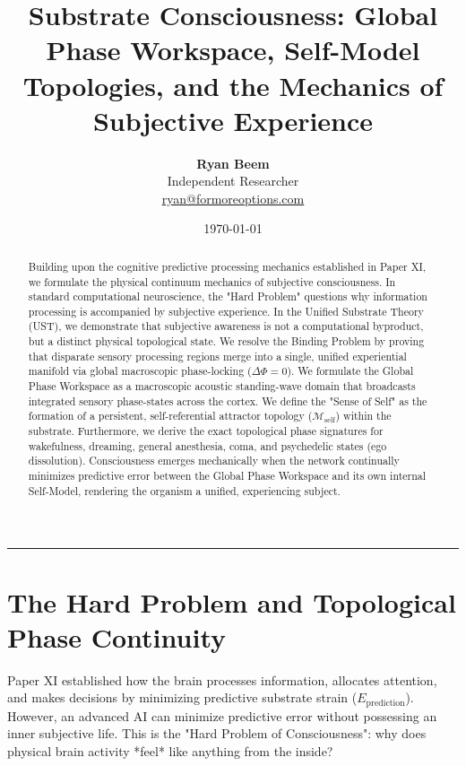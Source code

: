 \documentclass[11pt,a4paper]{article}
\title{\Large\bfseries Substrate Consciousness: Global Phase Workspace, Self-Model Topologies, and the Mechanics of Subjective Experience}
\author{
	\textbf{Ryan Beem}\\[0.5em]
	\small Independent Researcher \\
	\small \href{mailto:ryan@formoreoptions.com}{ryan@formoreoptions.com}
}
\date{\today}
\begin{document}
	
	\maketitle
	
	\begin{abstract}
		Building upon the cognitive predictive processing mechanics established in Paper XI, we formulate the physical continuum mechanics of subjective consciousness. In standard computational neuroscience, the "Hard Problem" questions why information processing is accompanied by subjective experience. In the Unified Substrate Theory (UST), we demonstrate that subjective awareness is not a computational byproduct, but a distinct physical topological state. We resolve the Binding Problem by proving that disparate sensory processing regions merge into a single, unified experiential manifold via global macroscopic phase-locking ($\Delta \Phi = 0$). We formulate the Global Phase Workspace as a macroscopic acoustic standing-wave domain that broadcasts integrated sensory phase-states across the cortex. We define the "Sense of Self" as the formation of a persistent, self-referential attractor topology ($\mathcal{M}_{\text{self}}$) within the substrate. Furthermore, we derive the exact topological phase signatures for wakefulness, dreaming, general anesthesia, coma, and psychedelic states (ego dissolution). Consciousness emerges mechanically when the network continually minimizes predictive error between the Global Phase Workspace and its own internal Self-Model, rendering the organism a unified, experiencing subject.
	\end{abstract}
	
	\vspace{1em}
	\hrule
	\vspace{1.5em}
	
	\section{The Hard Problem and Topological Phase Continuity}
	\label{sec:hard_problem}
	
	Paper XI \cite{PaperXI} established how the brain processes information, allocates attention, and makes decisions by minimizing predictive substrate strain ($E_{\text{prediction}}$). However, an advanced AI can minimize predictive error without possessing an inner subjective life. This is the "Hard Problem of Consciousness": why does physical brain activity *feel* like anything from the inside?
	
\end{document}
